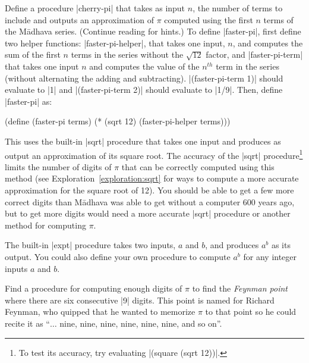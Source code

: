 \begin{schemeregion}
{\begin{subexerciselist}
\item \doublegoldstar
Define a procedure \scheme|cherry-pi| that takes as input $n$, the number of terms to include and outputs an approximation of $\pi$ computed using the first $n$ terms of the M\={a}dhava series.  (Continue reading for hints.)
To define \scheme|faster-pi|, first define two helper functions: \scheme|faster-pi-helper|, that takes one input, $n$, and computes the sum of the first $n$ terms in the series without the $\sqrt{12}$ factor, and \scheme|faster-pi-term| that takes one input $n$ and computes the value of the $n^{th}$ term in the series (without alternating the adding and subtracting).  \scheme|(faster-pi-term 1)| should evaluate to \schemeresult|1| and \scheme|(faster-pi-term 2)| should evaluate to \schemeresult|1/9|.  Then, define \scheme|faster-pi| as:
\begin{schemedisplay}
(define (faster-pi terms) (* (sqrt 12) (faster-pi-helper terms)))
\end{schemedisplay}
This uses the built-in \scheme|sqrt| procedure that takes one input and produces as output an approximation of its square root.  The accuracy of the \scheme|sqrt| procedure\footnote{To test its accuracy, try evaluating \scheme|(square (sqrt 12))|.} limits the number of digits of $\pi$ that can be correctly computed using this method (see Exploration~\ref{exploration:sqrt} for ways to compute a more accurate approximation for the square root of 12).  You should be able to get a few more correct digits than M\={a}dhava was able to get without a computer 600 years ago, but to get more digits would need a more accurate \scheme|sqrt| procedure or another method for computing $\pi$.

The built-in \scheme|expt| procedure takes two inputs, $a$ and $b$, and produces $a^b$ as its output.  You could also define your own procedure to compute $a^b$ for any integer inputs $a$ and $b$.
\item \triplegoldstar Find a procedure for computing enough digits of $\pi$ to find the \emph{Feynman point} where there are six consecutive \scheme|9| digits.  This point is named for Richard Feynman, who quipped that he wanted to memorize $\pi$ to that point so he could recite it as ``$\ldots$ nine, nine, nine, nine, nine, nine, and so on''.  
\end{subexerciselist}




}
\end{schemeregion}
